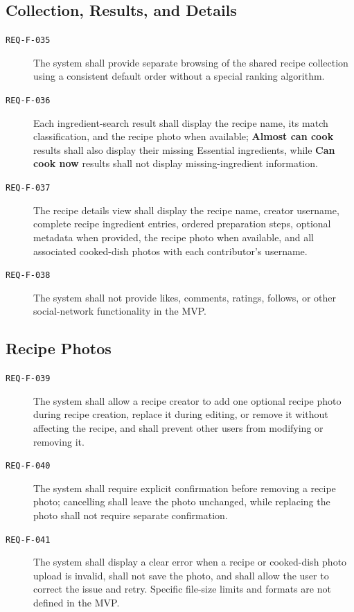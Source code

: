 \documentclass[12pt]{article}
\begin{document}
\subsection{Collection, Results, and Details}
\begin{description}
    \item[\texttt{REQ-F-035}] The system shall provide separate browsing of the shared recipe collection using a consistent default order without a special ranking algorithm.
    \item[\texttt{REQ-F-036}] Each ingredient-search result shall display the recipe name, its match classification, and the recipe photo when available; \textbf{Almost can cook} results shall also display their missing Essential ingredients, while \textbf{Can cook now} results shall not display missing-ingredient information.
    \item[\texttt{REQ-F-037}] The recipe details view shall display the recipe name, creator username, complete recipe ingredient entries, ordered preparation steps, optional metadata when provided, the recipe photo when available, and all associated cooked-dish photos with each contributor's username.
    \item[\texttt{REQ-F-038}] The system shall not provide likes, comments, ratings, follows, or other social-network functionality in the MVP.
\end{description}

\subsection{Recipe Photos}
\begin{description}
    \item[\texttt{REQ-F-039}] The system shall allow a recipe creator to add one optional recipe photo during recipe creation, replace it during editing, or remove it without affecting the recipe, and shall prevent other users from modifying or removing it.
    \item[\texttt{REQ-F-040}] The system shall require explicit confirmation before removing a recipe photo; cancelling shall leave the photo unchanged, while replacing the photo shall not require separate confirmation.
    \item[\texttt{REQ-F-041}] The system shall display a clear error when a recipe or cooked-dish photo upload is invalid, shall not save the photo, and shall allow the user to correct the issue and retry. Specific file-size limits and formats are not defined in the MVP.
\end{description}
\end{document}
